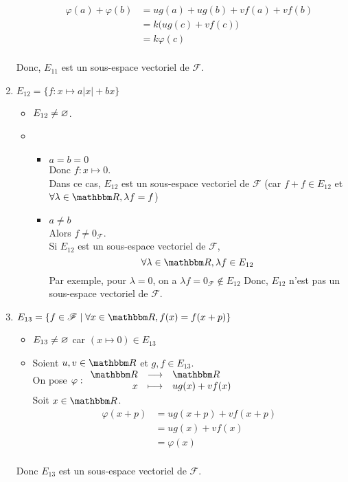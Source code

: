 \begin{enumerate}
\begin{itemize}
				\begin{align*}
					\varphi(a) + \varphi(b) &= ug(a) + ug(b) + vf(a) + vf(b) \\
					&= k\big(ug(c) + vf(c)\big) \\
					&= k\varphi(c) \\
				\end{align*}
		\end{itemize}
		Donc, $E_{11}$ est un sous-espace vectoriel de $\mathcal{F}$.
	\item $E_{12} = \{f: x\mapsto a\left| x \right| +bx\}$
		\begin{itemize}
			\item $E_{12} \neq \varnothing$.
			\item
				\begin{itemize}
					\item[\underlin{\sc Cas 1}] $a=b=0$\\
						Donc $f: x \mapsto 0$.\\
						Dans ce cas, $E_{12}$ est un sous-espace vectoriel de $\mathcal{F}$ (car $f + f \in E_{12}$ et $\forall \lambda \in \R, \lambda f = f$)
					\item[\underlin{\sc Cas 2}] $a \neq b$\\
						Alors $f \neq 0_\mathcal{F}$.\\
						Si $E_{12}$ est un sous-espace vectoriel de $\mathcal{F}$,  \[
							\forall \lambda \in \R, \lambda f \in E_{12}
						\] Par exemple, pour $\lambda = 0$, on a $\lambda f = 0_\mathcal{F} \not\in E_{12}$
						Donc, $E_{12}$ n'est pas un sous-espace vectoriel de $\mathcal{F}$.
				\end{itemize}
		\end{itemize}
	\item $E_{13} = \{f \in \mathcal{F} \mid \forall x \in \R, f(x) = f(x + p)\}$
		\begin{itemize}
			\item $E_{13} \neq \varnothing$ car $(x\mapsto 0) \in E_{13}$
			\item Soient $u,v \in \R$ et $g,f \in E_{13}$.\\
				On pose $\varphi : \begin{array}{rcl}
					\R &\longrightarrow& \R \\
					x &\longmapsto& ug(x) + vf(x)
				\end{array}$\\
				Soit $x\in \R$.
				\begin{align*}
					\varphi(x+p) &= ug(x+p) + vf(x+p)\\
					&= ug(x) + vf(x) \\
					&= \varphi(x) \\
				\end{align*}
		\end{itemize}

		Donc $E_{13}$ est un sous-espace vectoriel de $\mathcal{F}$.
\end{enumerate}
